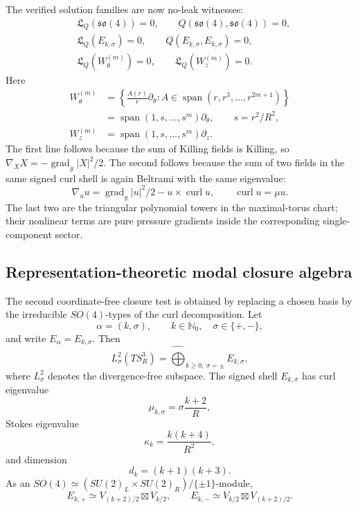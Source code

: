 \documentclass[aps,prd,reprint,superscriptaddress,nofootinbib,floatfix]{revtex4-2}
\theoremstyle{definition}
\theoremstyle{remark}
\newcommand{\gradg}{\operatorname{grad}_g}
\begin{document}
The verified solution families are now no-leak witnesses:
\begin{align}
	 & \mathfrak L_Q(\mathfrak{so}(4))=0,\qquad
	   Q(\mathfrak{so}(4),\mathfrak{so}(4))=0, \\
	 & \mathfrak L_Q(E_{k,\sigma})=0,\qquad
	   Q(E_{k,\sigma},E_{k,\sigma})=0,          \\
	 & \mathfrak L_Q(W_\theta^{(m)})=0,\qquad
	   \mathfrak L_Q(W_z^{(m)})=0 .
\end{align}
Here
\begin{align}
	W_\theta^{(m)}
	 & =
	\left\{\frac{A(r)}r\partial_\theta:
	A\in\operatorname{span}(r,r^3,\dots,r^{2m+1})\right\} \nonumber\\
	 & =
	\operatorname{span}(1,s,\dots,s^m)\partial_\theta,
	\qquad s=r^2/R^2,                                    \\
	W_z^{(m)}
	 & =
	\operatorname{span}(1,s,\dots,s^m)\partial_z .
\end{align}
The first line follows because the sum of Killing fields is Killing, so \(\nabla_X X=-\gradg |X|^2/2\).  The second follows because the sum of two fields in the same signed curl shell is again Beltrami with the same eigenvalue:
\[
	\nabla_u u=\gradg |u|^2/2-u\times\operatorname{curl}u,
	\qquad \operatorname{curl}u=\mu u.
\]
The last two are the triangular polynomial towers in the maximal-torus chart; their nonlinear terms are pure pressure gradients inside the corresponding single-component sector.

\subsection{Representation-theoretic modal closure algebra}

The second coordinate-free closure test is obtained by replacing a chosen basis by the irreducible \(SO(4)\)-types of the curl decomposition.  Let
\[
	\alpha=(k,\sigma),\qquad k\in\mathbb N_0,\quad \sigma\in\{+,-\},
\]
and write \(E_\alpha=E_{k,\sigma}\).  Then
\begin{equation}
	L^2_\sigma(TS^3_R)=\widehat{\bigoplus}_{k\ge0,\ \sigma=\pm}E_{k,\sigma},
	\label{eq:curl-decomp}
\end{equation}
where \(L^2_\sigma\) denotes the divergence-free subspace.  The signed shell \(E_{k,\sigma}\) has curl eigenvalue
\[
	\mu_{k,\sigma}=\sigma\frac{k+2}{R},
\]
Stokes eigenvalue
\[
	\kappa_k=\frac{k(k+4)}{R^2},
\]
and dimension
\[
	d_k=(k+1)(k+3).
\]
As an \(SO(4)\simeq(SU(2)_L\times SU(2)_R)/\{\pm1\}\)-module,
\begin{equation}
	E_{k,+}\simeq V_{(k+2)/2}\boxtimes V_{k/2},\qquad
	E_{k,-}\simeq V_{k/2}\boxtimes V_{(k+2)/2}.
	\label{eq:irreptype}
\end{equation}
\end{document}
